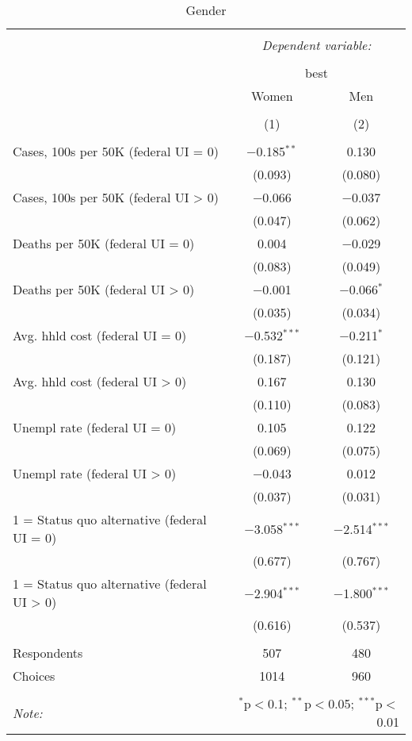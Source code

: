 
\begin{table}[!htbp] \centering 
  \caption{Gender} 
  \label{} 
\begin{tabular}{@{\extracolsep{5pt}}lcc} 
\\[-1.8ex]\hline 
\hline \\[-1.8ex] 
 & \multicolumn{2}{c}{\textit{Dependent variable:}} \\ 
\cline{2-3} 
\\[-1.8ex] & \multicolumn{2}{c}{best} \\ 
 & Women & Men \\ 
\\[-1.8ex] & (1) & (2)\\ 
\hline \\[-1.8ex] 
 Cases, 100s per 50K (federal UI = 0) & $-$0.185$^{**}$ & 0.130 \\ 
  & (0.093) & (0.080) \\ 
  Cases, 100s per 50K (federal UI > 0) & $-$0.066 & $-$0.037 \\ 
  & (0.047) & (0.062) \\ 
  Deaths per 50K (federal UI = 0) & 0.004 & $-$0.029 \\ 
  & (0.083) & (0.049) \\ 
  Deaths per 50K (federal UI > 0) & $-$0.001 & $-$0.066$^{*}$ \\ 
  & (0.035) & (0.034) \\ 
  Avg. hhld cost (federal UI = 0) & $-$0.532$^{***}$ & $-$0.211$^{*}$ \\ 
  & (0.187) & (0.121) \\ 
  Avg. hhld cost (federal UI > 0) & 0.167 & 0.130 \\ 
  & (0.110) & (0.083) \\ 
  Unempl rate (federal UI = 0) & 0.105 & 0.122 \\ 
  & (0.069) & (0.075) \\ 
  Unempl rate (federal UI > 0) & $-$0.043 & 0.012 \\ 
  & (0.037) & (0.031) \\ 
  1 = Status quo alternative (federal UI = 0) & $-$3.058$^{***}$ & $-$2.514$^{***}$ \\ 
  & (0.677) & (0.767) \\ 
  1 = Status quo alternative (federal UI > 0) & $-$2.904$^{***}$ & $-$1.800$^{***}$ \\ 
  & (0.616) & (0.537) \\ 
 \hline \\[-1.8ex] 
Respondents & 507 & 480\\ 
 Choices & 1014 & 960\\ 
\hline 
\hline \\[-1.8ex] 
\textit{Note:}  & \multicolumn{2}{r}{$^{*}$p$<$0.1; $^{**}$p$<$0.05; $^{***}$p$<$0.01} \\ 
\end{tabular} 
\end{table} 
